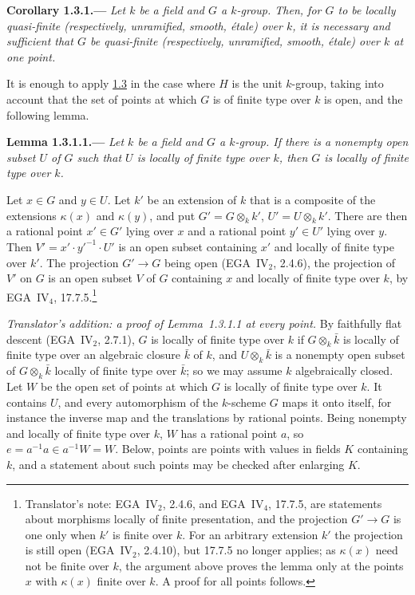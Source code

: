 
\medskip
{}\label{cor:sga3-VIB-1.3.1}%
\noindent\textbf{Corollary 1.3.1.---}
\emph{Let \(k\) be a field and \(G\) a \(k\)-group. Then, for \(G\) to be
locally quasi-finite (respectively, unramified, smooth, \'etale) over
\(k\), it is necessary and sufficient that \(G\) be quasi-finite
(respectively, unramified, smooth, \'etale) over \(k\) at one point.}

It is enough to apply \hyperref[prop:sga3-VIB-1.3]{1.3} in the case where \(H\) is the unit
\(k\)-group, taking into account that the set of points at which \(G\)
is of finite type over \(k\) is open, and the following lemma.

\medskip
{}\label{lem:sga3-VIB-1.3.1.1}%
\noindent\textbf{Lemma 1.3.1.1.---}
\emph{Let \(k\) be a field and \(G\) a \(k\)-group. If there is a nonempty
open subset \(U\) of \(G\) such that \(U\) is locally of finite type over
\(k\), then \(G\) is locally of finite type over \(k\).}

Let \(x\in G\) and \(y\in U\). Let \(k'\) be an extension of \(k\) that is
a composite of the extensions \(\kappa(x)\) and \(\kappa(y)\), and put
\(G'=G\otimes_kk'\), \(U'=U\otimes_kk'\). There are then a rational point
\(x'\in G'\) lying over \(x\) and a rational point \(y'\in U'\) lying over
\(y\). Then \(V'=x'\cdot y'^{-1}\cdot U'\) is an open subset containing
\(x'\) and locally of finite type over \(k'\). The projection \(G'\to G\)
being open (EGA~IV\(_2\), 2.4.6), the projection of \(V'\) on \(G\) is an
open subset \(V\) of \(G\) containing \(x\) and locally of finite type over
\(k\), by EGA~IV\(_4\), 17.7.5.\footnote{Translator's note: EGA~IV\(_2\), 2.4.6, and EGA~IV\(_4\),
17.7.5, are statements about morphisms locally of finite presentation, and the projection \(G'\to G\)
is one only when \(k'\) is finite over \(k\). For an arbitrary extension \(k'\) the projection is
still open (EGA~IV\(_2\), 2.4.10), but 17.7.5 no longer applies; as \(\kappa(x)\) need not be finite
over \(k\), the argument above proves the lemma only at the points \(x\) with \(\kappa(x)\) finite over
\(k\). A proof for all points follows.}

\medskip\noindent
\emph{Translator's addition: a proof of Lemma~\textup{1.3.1.1} at every point.} By faithfully flat
descent (EGA~IV\(_2\), 2.7.1), \(G\) is locally of finite type over \(k\) if \(G\otimes_k\bar k\) is
locally of finite type over an algebraic closure \(\bar k\) of \(k\), and \(U\otimes_k\bar k\) is a
nonempty open subset of \(G\otimes_k\bar k\) locally of finite type over \(\bar k\); so we may assume
\(k\) algebraically closed. Let \(W\) be the open set of points at which \(G\) is locally of finite
type over \(k\). It contains \(U\), and every automorphism of the \(k\)-scheme \(G\) maps it onto
itself, for instance the inverse map and the translations by rational points. Being nonempty and
locally of finite type over \(k\), \(W\) has a rational point \(a\), so \(e=a^{-1}a\in a^{-1}W=W\).
Below, points are points with values in fields \(K\) containing \(k\), and a statement about such
points may be checked after enlarging \(K\).

